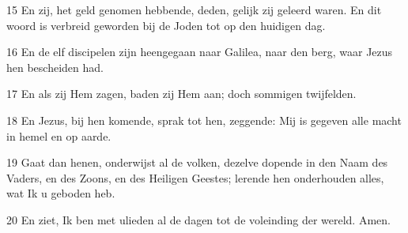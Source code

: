 \par 15 En zij, het geld genomen hebbende, deden, gelijk zij geleerd waren. En dit woord is verbreid geworden bij de Joden tot op den huidigen dag.
\par 16 En de elf discipelen zijn heengegaan naar Galilea, naar den berg, waar Jezus hen bescheiden had.
\par 17 En als zij Hem zagen, baden zij Hem aan; doch sommigen twijfelden.
\par 18 En Jezus, bij hen komende, sprak tot hen, zeggende: Mij is gegeven alle macht in hemel en op aarde.
\par 19 Gaat dan henen, onderwijst al de volken, dezelve dopende in den Naam des Vaders, en des Zoons, en des Heiligen Geestes; lerende hen onderhouden alles, wat Ik u geboden heb.
\par 20 En ziet, Ik ben met ulieden al de dagen tot de voleinding der wereld. Amen.




